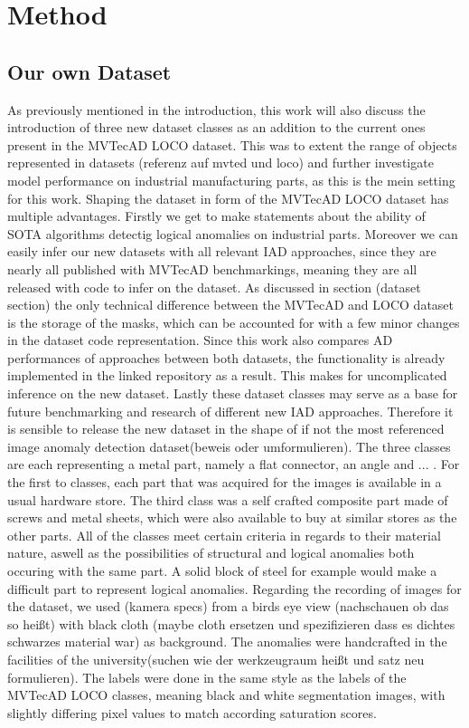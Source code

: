 \chapter{Method}
\label{chap:method}


\section{Our own Dataset}
As previously mentioned in the introduction, this work will also discuss the introduction of three new dataset classes as an addition to the current ones present in the MVTecAD LOCO dataset.
This was to extent the range of objects represented in datasets (referenz auf mvted und loco) and further investigate model performance on industrial manufacturing parts, as this is the 
mein setting for this work. Shaping the dataset in form of the MVTecAD LOCO dataset has multiple advantages. Firstly we get to make statements about the ability of SOTA algorithms detectig 
logical anomalies on industrial parts. Moreover we can easily infer our new datasets with all relevant IAD approaches, since they are nearly all published with MVTecAD benchmarkings, meaning 
they are all released with code to infer on the dataset. As discussed in section (dataset section) the only technical difference between the MVTecAD and LOCO dataset is the storage of the masks, 
which can be accounted for with a few minor changes in the dataset code representation. Since this work also compares AD performances of approaches between both datasets, the functionality 
is already implemented in the linked repository as a result. This makes for uncomplicated inference on the new dataset. Lastly these dataset classes may serve as a base for future benchmarking 
and research of different new IAD approaches. Therefore it is sensible to release the new dataset in the shape of if not the most referenced image anomaly detection dataset(beweis oder umformulieren). 
The three classes are each representing a metal part, namely a flat connector, an angle and ... . For the first to classes, each part that was acquired for the images is available in a 
usual hardware store. The third class was a self crafted composite part made of screws and metal sheets, which were also available to buy at similar stores as the other parts. All of the classes 
meet certain criteria in regards to their material nature, aswell as the possibilities of structural and logical anomalies both occuring with the same part. A solid block of steel for example 
would make a difficult part to represent logical anomalies.
Regarding the recording of images for the dataset, we used (kamera specs) from a birds eye view (nachschauen ob das so heißt) with black cloth (maybe cloth ersetzen und spezifizieren dass es 
dichtes schwarzes material war) as background. The anomalies were handcrafted in the facilities of the university(suchen wie der werkzeugraum heißt und satz neu formulieren). The labels 
were done in the same style as the labels of the MVTecAD LOCO classes, meaning black and white segmentation images, with slightly differing pixel values to match according saturation scores. 

